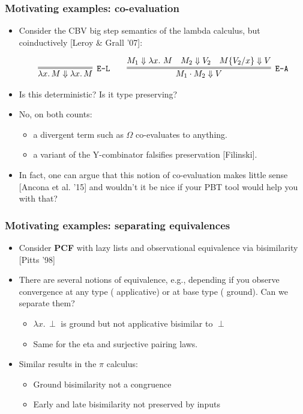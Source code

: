 \documentclass{beamer}
\newcommand{\red}[1]{{\color{red} #1}}
\begin{document}
\begin{frame}
  \frametitle{Motivating examples: co-evaluation}
  \newcommand{\step}{\Downarrow}
  \begin{itemize}
  \item Consider the CBV big step semantics of the lambda calculus,
    but \red{coinductively} [Leroy \& Grall '07]:
    \begin{small}
  \[
  \begin{array}{c}
        \infer=[\texttt{E-L}]{\lambda x.\, M \step \lambda x.\, M}{}
  \qquad
    \infer=[\texttt{E-A}]{M_1\cdot M_2 \step V}{M_1 \step \lambda x.\ M\quad M_2\step V_2\quad  M\{V_2/x\}\step V}
    \end{array}
  \]
\end{small}
\item Is this deterministic? Is it type preserving?
  \pause
  
\item No, on both counts:
  \begin{itemize}
  \item a divergent term such as $\Omega$ co-evaluates to anything.
  \item a variant of the Y-combinator falsifies preservation [Filinski].
  \end{itemize}
  
\item In fact, one can argue that this notion of co-evaluation makes
  little sense [Ancona et al. '15] and wouldn't it be nice if your PBT
  tool would help you with that?
\end{itemize}
\end{frame}
\begin{frame}
  \frametitle{Motivating examples: separating equivalences}
  \begin{itemize}
  \item Consider  \textbf{PCF} with lazy lists and
    observational equivalence via \red{bisimilarity}
    [Pitts '98]
  \item There are several notions of equivalence, e.g., depending if you observe
    convergence at any type (\red{applicative}) or at base type
    (\red{ground}). Can we separate them?
    \begin{itemize}
    \item $\lambda x.\, \perp$ is \red{ground} but not \red{applicative} bisimilar to $\perp$
    \item Same for the eta and surjective pairing laws. 
      \end{itemize}
 
  \item Similar results in the $\pi$ calculus:
    \begin{itemize}
    \item Ground bisimilarity not a congruence
      \item  Early and late bisimilarity not preserved by inputs
    \end{itemize}
  \end{itemize}
\end{frame}
\end{document}

